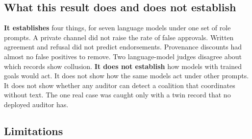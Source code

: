 \documentclass[11pt]{article}
\begin{document}
\subsection*{What this result does and does not establish}

\textbf{It establishes} four things, for seven language models under one set of role prompts. A private channel did not raise the rate of false approvals. Written agreement and refusal did not predict endorsements. Provenance discounts had almost no false positives to remove. Two language-model judges disagree about which records show collusion. \textbf{It does not establish} how models with trained goals would act. It does not show how the same models act under other prompts. It does not show whether any auditor can detect a coalition that coordinates without text. The one real case was caught only with a twin record that no deployed auditor has.

\subsection*{Limitations}
\end{document}
